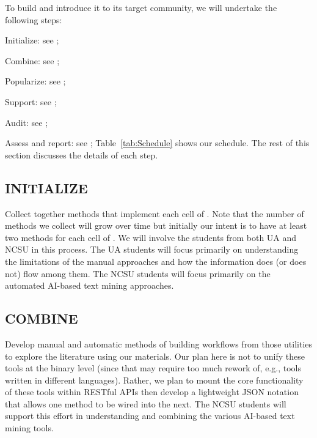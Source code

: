 
 
\noindent
To build {\IT} and introduce it to its target community, we will
undertake the following steps:
\bii
\item Initialize: see ;
\item Combine: see ;
\item Popularize: see ;
\item Support: see ;
\item Audit: see ;
\item Assess and report: see ;
\eii
\vspace{4pt}
Table~\ref{tab:Schedule} shows our schedule. The rest of this section discusses the details of each step.
 
 
\begin{center}

\end{center}
 

\subsection{INITIALIZE}\label{tion:init} Collect together methods that implement each cell of 
. Note that the number of methods we collect will grow over time but initially our intent is to have at least two methods for each cell of .
We will involve the students from both UA and NCSU in this process.
The UA students will focus primarily on understanding the limitations of the manual approaches and how the information does (or does not) flow among them.
The NCSU students will focus primarily on the automated AI-based text mining approaches.
\vspace{8pt}


\subsection{COMBINE}\label{tion:combine} 
Develop manual and automatic methods of building workflows from those utilities to explore the literature using our materials.
Our plan here is not to unify these tools at the binary level (since that may require too much rework of, e.g., tools written in different languages). Rather, we plan to mount the core functionality of these tools within RESTful APIs then develop a lightweight JSON notation that allows one method to be wired into the next.
The NCSU students will support this effort in understanding and combining the various AI-based text mining tools.

